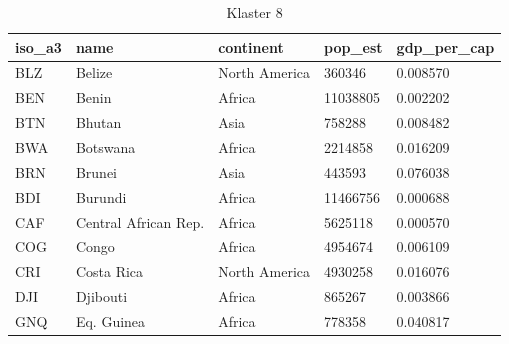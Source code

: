 \documentclass[11pt]{report}
\begin{document}
    \begin{table}[h!]
        \caption {Klaster 8} \label{tab:cl8}
        \begin{tabular}{lllll}
            \hline
            \multicolumn{1}{|l|}{iso\_a3} & \multicolumn{1}{l|}{name} & \multicolumn{1}{l|}{continent} & \multicolumn{1}{l|}{pop\_est} & \multicolumn{1}{l|}{gdp\_per\_cap} \\ \hline
            BLZ                           & Belize                    & North America                  & 360346                        & 0.008570                           \\
            BEN                           & Benin                     & Africa                         & 11038805                      & 0.002202                           \\
            BTN                           & Bhutan                    & Asia                           & 758288                        & 0.008482                           \\
            BWA                           & Botswana                  & Africa                         & 2214858                       & 0.016209                           \\
            BRN                           & Brunei                    & Asia                           & 443593                        & 0.076038                           \\
            BDI                           & Burundi                   & Africa                         & 11466756                      & 0.000688                           \\
            CAF                           & Central African Rep.      & Africa                         & 5625118                       & 0.000570                           \\
            COG                           & Congo                     & Africa                         & 4954674                       & 0.006109                           \\
            CRI                           & Costa Rica                & North America                  & 4930258                       & 0.016076                           \\
            DJI                           & Djibouti                  & Africa                         & 865267                        & 0.003866                           \\
            GNQ                           & Eq. Guinea                & Africa                         & 778358                        & 0.040817                           \\

\end{tabular}
\end{table}
\end{document}
